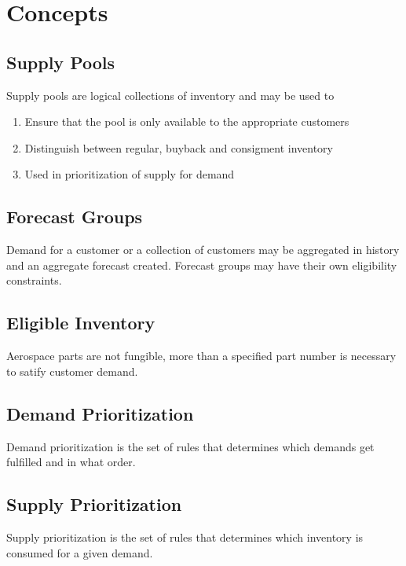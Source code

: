 \documentclass[letterpaper,10pt,english]{sphinxmanual}
\begin{document}
\chapter{Concepts}
\label{BusinessProcessReengineering:concepts}

\section{Supply Pools}
\label{BusinessProcessReengineering:supply-pools}
Supply pools are logical collections of inventory and may be used to
\begin{enumerate}
\item {} 
Ensure that the pool is only available to the appropriate customers

\item {} 
Distinguish between regular, buyback and consigment inventory

\item {} 
Used in prioritization of supply for demand

\end{enumerate}


\section{Forecast Groups}
\label{BusinessProcessReengineering:forecast-groups}
Demand for a customer or a collection of customers may be aggregated in
history and an aggregate forecast created. Forecast groups may have
their own eligibility constraints.


\section{Eligible Inventory}
\label{BusinessProcessReengineering:eligible-inventory}
Aerospace parts are not fungible, more than a specified part number is
necessary to satify customer demand.


\section{Demand Prioritization}
\label{BusinessProcessReengineering:demand-prioritization}
Demand prioritization is the set of rules that determines which demands
get fulfilled and in what order.


\section{Supply Prioritization}
\label{BusinessProcessReengineering:id3}
Supply prioritization is the set of rules that determines which
inventory is consumed for a given demand.
\end{document}
